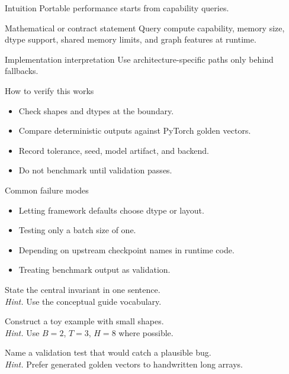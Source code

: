 \begin{intuitionbox}{Intuition}
Portable performance starts from capability queries.
\end{intuitionbox}

\begin{definitionbox}{Mathematical or contract statement}
Query compute capability, memory size, dtype support, shared memory limits, and graph features at runtime.
\end{definitionbox}

\begin{implementationbox}{Implementation interpretation}
Use architecture-specific paths only behind fallbacks.
\end{implementationbox}

\begin{verificationbox}{How to verify this works}
\begin{itemize}
\item Check shapes and dtypes at the boundary.
\item Compare deterministic outputs against PyTorch golden vectors.
\item Record tolerance, seed, model artifact, and backend.
\item Do not benchmark until validation passes.
\end{itemize}
\end{verificationbox}

\begin{warningbox}{Common failure modes}
\begin{itemize}
\item Letting framework defaults choose dtype or layout.
\item Testing only a batch size of one.
\item Depending on upstream checkpoint names in runtime code.
\item Treating benchmark output as validation.
\end{itemize}
\end{warningbox}

\begin{chapterexercises}
\item State the central invariant in one sentence.\\
\textit{Hint.} Use the conceptual guide vocabulary.
\item Construct a toy example with small shapes.\\
\textit{Hint.} Use $B=2$, $T=3$, $H=8$ where possible.
\item Name a validation test that would catch a plausible bug.\\
\textit{Hint.} Prefer generated golden vectors to handwritten long arrays.
\end{chapterexercises}

